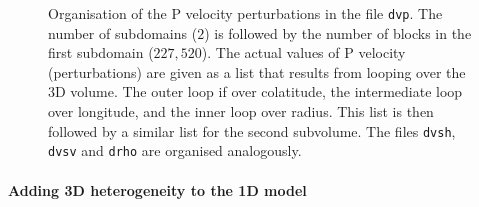 \begin{center}
\begin{figure}
\center{} 
\caption{Organisation of the P velocity perturbations in the file \texttt{dvp}. The number of subdomains ($2$) is followed by the number of blocks in the first subdomain ($227,520$). The actual values of P velocity (perturbations) are given as a list that results from looping over the 3D volume. The outer loop if over colatitude, the intermediate loop over longitude, and the inner loop over radius. This list is then followed by a similar list for the second subvolume. The files \texttt{dvsh}, \texttt{dvsv} and \texttt{drho} are organised analogously.}\label{F:perturbations}
\end{figure}
\end{center}

\paragraph{Adding 3D heterogeneity to the 1D model}

